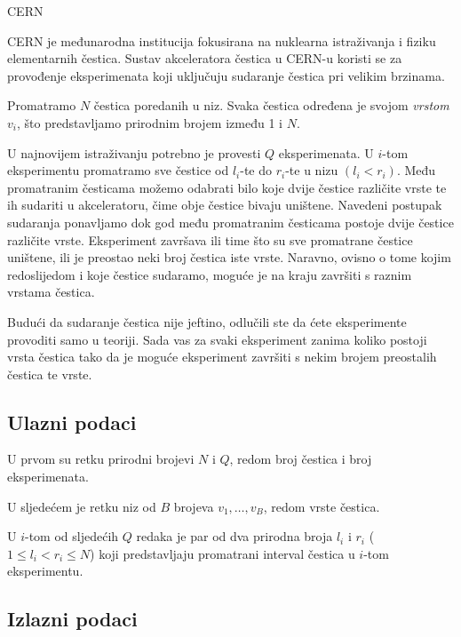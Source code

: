\begin{statement}[
  problempoints=100,
  timelimit=1.5 sekunda,
  memorylimit=512 MiB,
]{CERN}

CERN je međunarodna institucija fokusirana na nuklearna istraživanja i fiziku elementarnih čestica. 
Sustav akceleratora čestica u CERN-u koristi se za provođenje eksperimenata koji uključuju sudaranje čestica pri velikim brzinama. 

Promatramo $N$ čestica poredanih u niz. Svaka čestica određena je svojom \textit{vrstom} $v_i$, što 
predstavljamo prirodnim brojem između 1 i $N$. 

U najnovijem istraživanju potrebno je provesti $Q$ eksperimenata. U $i$-tom eksperimentu 
promatramo sve čestice od $l_i$-te do $r_i$-te u nizu $(l_i < r_i)$. Među promatranim česticama 
možemo odabrati bilo koje dvije čestice različite vrste te ih sudariti u akceleratoru, čime obje 
čestice bivaju uništene. Navedeni postupak sudaranja ponavljamo dok god među promatranim česticama 
postoje dvije čestice različite vrste. Eksperiment završava ili time što su sve promatrane čestice 
uništene, ili je preostao neki broj čestica iste vrste. Naravno, ovisno o tome kojim redoslijedom i 
koje čestice sudaramo, moguće je na kraju završiti s raznim vrstama čestica. 

Budući da sudaranje čestica nije jeftino, 
odlučili ste da ćete eksperimente provoditi samo u teoriji. Sada vas za svaki eksperiment zanima 
koliko postoji vrsta čestica tako da je moguće eksperiment završiti s nekim brojem preostalih 
čestica te vrste. 

\subsection*{Ulazni podaci}

U prvom su retku prirodni brojevi $N$ i $Q$, redom broj čestica i broj eksperimenata.

U sljedećem je retku niz od $B$ brojeva $v_1, \dots, v_B$, redom vrste čestica. 

U $i$-tom od sljedećih $Q$ redaka je par od dva prirodna broja $l_i$ i $r_i$ 
($1 \leq l_i < r_i \leq N$) koji predstavljaju promatrani interval čestica u $i$-tom eksperimentu.  

\subsection*{Izlazni podaci}


\end{statement}
